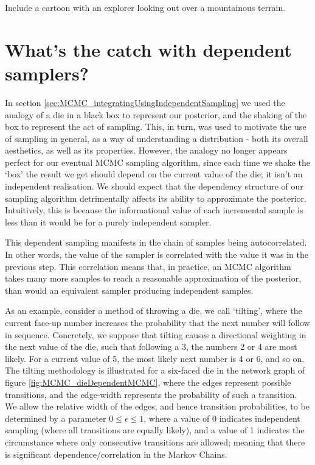 \documentclass[11pt,fullpage]{book}
\begin{document}
Include a cartoon with an explorer looking out over a mountainous terrain.

\section{What's the catch with dependent samplers?}\label{sec:MCMC_correlationInDependentSamplers}
In section \ref{sec:MCMC_integratingUsingIndependentSampling} we used the analogy of a die in a black box to represent our posterior, and the shaking of the box to represent the act of sampling. This, in turn, was used to motivate the use of sampling in general, as a way of understanding a distribution - both its overall aesthetics, as well as its properties. However, the analogy no longer appears perfect for our eventual MCMC sampling algorithm, since each time we shake the `box' the result we get should depend on the current value of the die; it isn't an independent realisation. We should expect that the dependency structure of our sampling algorithm detrimentally affects its ability to approximate the posterior. Intuitively, this is because the informational value of each incremental sample is less than it would be for a purely independent sampler.

This dependent sampling manifests in the chain of samples being autocorrelated. In other words, the value of the sampler is correlated with the value it was in the previous step. This correlation means that, in practice, an MCMC algorithm takes many more samples to reach a reasonable approximation of the posterior, than would an equivalent sampler producing independent samples.

As an example, consider a method of throwing a die, we call `tilting', where the current face-up number increases the probability that the next number will follow in sequence. Concretely, we suppose that tilting causes a directional weighting in the next value of the die, such that following a 3, the numbers 2 or 4 are most likely. For a current value of 5, the most likely next number is 4 or 6, and so on. The tilting methodology is illustrated for a six-faced die in the network graph of figure \ref{fig:MCMC_dieDependentMCMC}, where the edges represent possible transitions, and the edge-width represents the probability of such a transition. We allow the relative width of the edges, and hence transition probabilities, to be determined by a parameter $0\leq \epsilon \leq 1$, where a value of 0 indicates independent sampling (where all transitions are equally likely), and a value of 1 indicates the circumstance where only consecutive transitions are allowed; meaning that there is significant dependence/correlation in the Markov Chains. 
\end{document}
